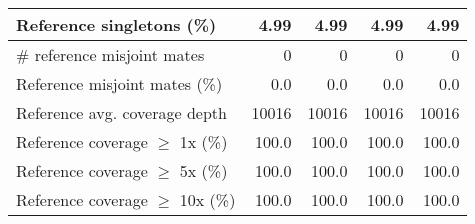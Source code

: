 \documentclass[12pt,a4paper]{article}
\begin{document}
\begin{table}[ht]
\begin{center}
\begin{tabular}{|l*{4}{|r}|}
Reference singletons (\%) & 4.99 & 4.99 & 4.99 & 4.99 \\ \hline
\# reference misjoint mates & 0 & 0 & 0 & 0 \\ \hline
Reference misjoint mates (\%) & 0.0 & 0.0 & 0.0 & 0.0 \\ \hline
Reference avg. coverage depth & 10016 & 10016 & 10016 & 10016 \\ \hline
Reference coverage $\geq$ 1x (\%) & 100.0 & 100.0 & 100.0 & 100.0 \\ \hline
Reference coverage $\geq$ 5x (\%) & 100.0 & 100.0 & 100.0 & 100.0 \\ \hline
Reference coverage $\geq$ 10x (\%) & 100.0 & 100.0 & 100.0 & 100.0 \\ \hline
\end{tabular}
\end{center}
\end{table}
\end{document}
